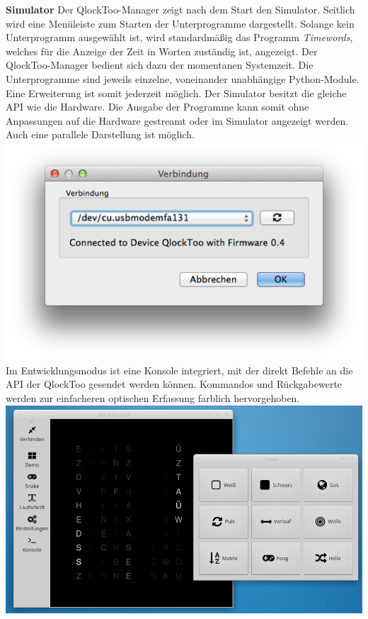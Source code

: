 \begin{multicols}{2}
\textbf{Simulator}
Der QlockToo-Manager zeigt nach dem Start den Simulator. Seitlich wird eine Menüleiste zum Starten der Unterprogramme dargestellt.
Solange kein Unterprogramm ausgewählt ist, wird standardmäßig das Programm \emph{Timewords}, welches für die Anzeige der Zeit in Worten zuständig ist, angezeigt. Der QlockToo-Manager bedient sich dazu der momentanen Systemzeit.
Die Unterprogramme sind jeweils einzelne, voneinander unabhängige Python-Module. Eine Erweiterung ist somit jederzeit möglich.
Der Simulator besitzt die gleiche API wie die Hardware. Die Ausgabe der Programme kann somit ohne Anpassungen auf die Hardware gestreamt oder im Simulator angezeigt werden. Auch eine parallele Darstellung ist möglich.
\includegraphics[width=\columnwidth]{Abbildungen/Software/ConnectDialog}
Im Entwicklungsmodus ist eine Konsole integriert, mit der direkt Befehle an die API der QlockToo gesendet werden können. Kommandos und Rückgabewerte werden zur einfacheren optischen Erfassung farblich hervorgehoben.
\includegraphics[width=\columnwidth]{Abbildungen/Software/Linux}


\end{multicols}

